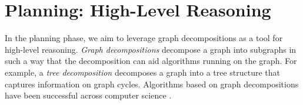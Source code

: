 








\section{Planning: High-Level Reasoning}
In the planning phase, we aim to leverage graph decompositions as a tool for high-level reasoning. \emph{Graph decompositions} \cite{halin1976s,robertson1984graph,RS91,ST94} decompose a graph into subgraphs in such a way that the decomposition can aid algorithms running on the graph.
For example, a \emph{tree decomposition} \cite{halin1976s,robertson1984graph} decomposes a graph into a tree structure that captures information on graph cycles.
Algorithms based on graph decompositions have been successful across computer science \cite{MPPV04,applegate2011traveling,cygan2015parameterized,GLST17}.

